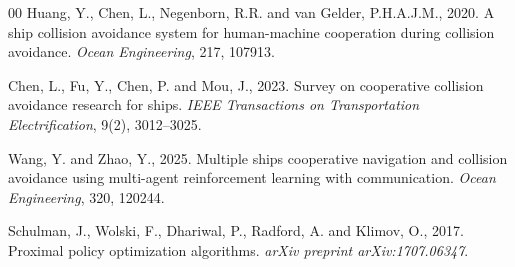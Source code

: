 \documentclass[final,5p,times,twocolumn]{elsarticle}
\begin{document}
\begin{thebibliography}{00}
Huang, Y., Chen, L., Negenborn, R.R. and van Gelder, P.H.A.J.M., 2020. A ship collision avoidance system for human-machine cooperation during collision avoidance. \textit{Ocean Engineering}, 217, 107913.

Chen, L., Fu, Y., Chen, P. and Mou, J., 2023. Survey on cooperative collision avoidance research for ships. \textit{IEEE Transactions on Transportation Electrification}, 9(2), 3012--3025.

Wang, Y. and Zhao, Y., 2025. Multiple ships cooperative navigation and collision avoidance using multi-agent reinforcement learning with communication. \textit{Ocean Engineering}, 320, 120244.

Schulman, J., Wolski, F., Dhariwal, P., Radford, A. and Klimov, O., 2017. Proximal policy optimization algorithms. \textit{arXiv preprint arXiv:1707.06347}.

\end{thebibliography}
\end{document}
